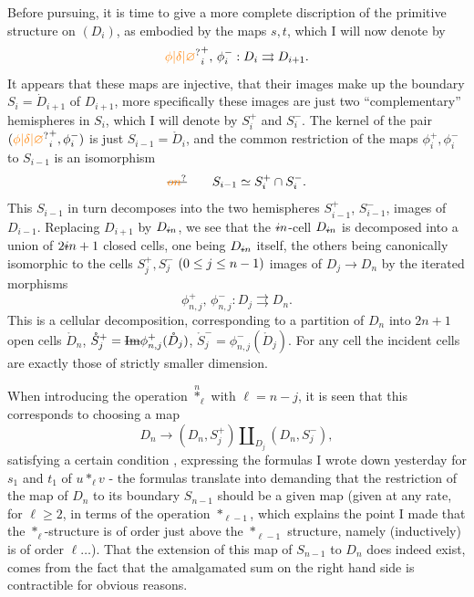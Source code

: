  Before pursuing, it is time to give a more complete discription of the primitive structure on $(D_i)$, as embodied by the maps $s,t$, which I will now denote by
\[
{\unsure{\phi|\delta|\varnothing}}_i^+,\,\phi_i^-:D_i\rightrightarrows D_{i+1}.
\]
It appears that these maps are injective, that their images make up
the boundary  $S_i=\dot{D}_{i+1}$ of $D_{i+1}$, more specifically these images are just two ``complementary'' hemispheres in $S_i$, which I will denote by $S_i^+$ and $S_i^-$. The kernel of the pair $({\unsure{\phi|\delta|\varnothing}}_i^+,\phi_i^-)$ is just $S_{i-1}=\mathring{D}_i$, and the common restriction of the maps $\phi_i^+,\phi_i^-$ to $S_{i-1}$ is an isomorphism
\[
\deleted{\unsure{on}}\qquad S_{i-1}\simeq S_i^+\cap S_i^-.
\]
This $S_{i-1}$ in turn decomposes into the two hemispheres $S_{i-1}^+$, $S_{i-1}^-$, images of $D_{i-1}$. Replacing $D_{i+1}$ by $D_{\deleted{i}\handwritten{n}}$, we see that the $\deleted{i}\handwritten{n}$-cell $D_{\deleted{i}\handwritten{n}}$ is decomposed into a union of $2\deleted{i}\handwritten{n}+1$ closed cells, one being $D_{\deleted{i}\handwritten{n}}$ itself, the others being canonically isomorphic to the cells $S_j^+,S_j^-$ $(0\leq j\leq n-1)$ images of $D_j\to D_n$ by the iterated morphisms
\[
\phi_{n,j}^+,\,\phi_{n,j}^-:D_j\rightrightarrows D_n.
\]
This is a cellular decomposition, corresponding to a partition of $D_n$ into $2n+1$ open cells $\mathring{D}_n$, $\mathring{S}_j^+=\deleted{\mathrm{Im}}\phi_{n,j}^+(\mathring{D}_j)$, $\mathring{S}_j^-=\phi_{n,j}^-(\mathring{D}_j)$. For any cell  the incident cells are exactly those of strictly smaller dimension.

When introducing the operation $\overset{n}{*}_\ell$ with $\ell=n-j$, it is seen that this corresponds to choosing a map
\[
D_n\longrightarrow(D_n,S_j^+)\amalg_{D_j}(D_n,S_j^-),
\]
satisfying a certain condition , expressing the formulas I wrote down yesterday for $s_1$ and $t_1$ of $u*_\ell v$  - the  formulas translate into demanding that the restriction of the  map of $D_n$ to its boundary $S_{n-1}$ should be a given map (given at any rate, for $\ell\geq2$, in terms of the operation $*_{\ell-1}$,  which explains the point I made that the $*_\ell$-structure is of order just above the $*_{\ell-1}$ structure, namely (inductively) is of order $\ell\ldots$). That the extension of this map of $S_{n-1}$ to $D_n$ does indeed exist, comes from the fact that the amalgamated sum on the right hand side is contractible for obvious reasons.

